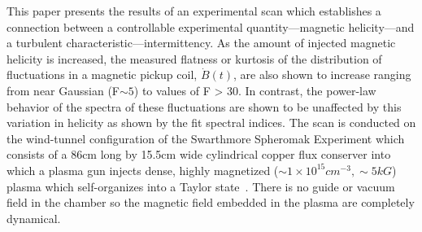 \documentclass[aip,prl,amsmath,amssymb,reprint,superscriptaddress]{revtex4-1} %
\begin{document}

This paper presents the results of an experimental scan which establishes a connection between a controllable experimental quantity---magnetic helicity---and a turbulent characteristic---intermittency. As the amount of injected magnetic helicity is increased, the measured flatness or kurtosis of the distribution of fluctuations in a magnetic pickup coil, $\dot{B}(t)$, are also shown to increase ranging from near Gaussian (F$\sim 5$) to values of F > 30. In contrast, the power-law behavior of the spectra of these fluctuations are shown to be unaffected by this variation in helicity as shown by the fit spectral indices. The scan is conducted on the wind-tunnel configuration of the Swarthmore Spheromak Experiment which consists of a 86cm long by 15.5cm wide cylindrical copper flux conserver into which a plasma gun injects dense, highly magnetized ($\sim 1\times 10^{15} cm^{-3}, \sim 5kG$) plasma which self-organizes into a Taylor state~\cite{Gray13}. There is no guide or vacuum field in the chamber so the magnetic field embedded in the plasma are completely dynamical. 

\end{document}
